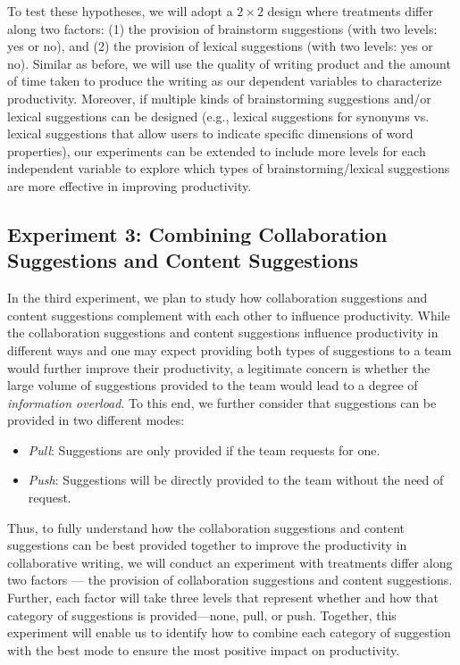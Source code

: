 To test these hypotheses, we will adopt a $2\times 2$ design where treatments differ along two factors: (1) the provision of brainstorm suggestions (with two levels: yes or no), and (2) the provision of lexical suggestions (with two levels: yes or no). Similar as before, we will use the quality of writing product and the amount of time taken to produce the writing as our dependent variables to characterize productivity. Moreover, if multiple kinds of brainstorming suggestions and/or lexical suggestions can be designed (e.g., lexical suggestions for synonyms vs. lexical suggestions that allow users to indicate specific dimensions of word properties),
our experiments can be 
extended to include more levels for each independent variable to explore which types of brainstorming/lexical suggestions are more effective in improving productivity.

\subsection{Experiment 3: Combining Collaboration Suggestions and Content Suggestions}
\label{sec:exp3}

In the third experiment, we plan to study how collaboration suggestions and content suggestions complement with each other to influence productivity. While the collaboration suggestions and content suggestions influence productivity in different ways and one may expect providing both types of suggestions to a team would further improve their productivity, a legitimate concern is whether the large volume of suggestions provided to the team would lead to a degree of {\em information overload}. To this end, we further consider that suggestions can be provided in two different modes:
\begin{itemize}[leftmargin=*,noitemsep,topsep=0pt,parsep=0pt,partopsep=0pt]
\item {\em Pull}: Suggestions are only provided if the team requests for one.
\item {\em Push}: Suggestions will be directly provided to the team without the need of request.
\end{itemize}
Thus, to fully understand how the collaboration suggestions and content suggestions can be best provided together to improve the productivity in collaborative writing, we will conduct an experiment with treatments differ along two factors --- the provision of collaboration suggestions and content suggestions. Further, each factor will take three levels that represent whether and how that category of suggestions is provided---none, pull, or push. Together, this experiment will enable us to identify how to combine each category of suggestion with the best mode to ensure the most positive impact on productivity. 

